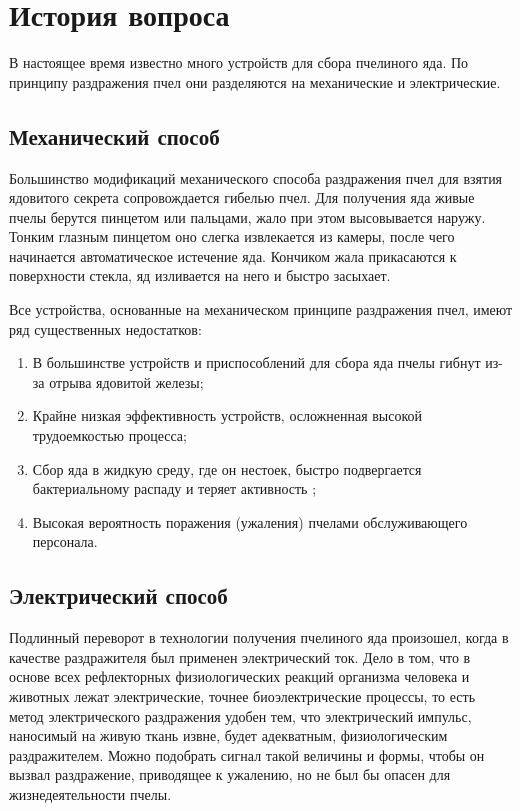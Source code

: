 \section{История вопроса}

В настоящее время известно много устройств для сбора пчелиного яда. По принципу раздражения пчел они разделяются на механические и электрические.

\subsection*{Механический способ}

Большинство модификаций механического способа раздражения пчел для взятия ядовитого секрета сопровождается гибелью пчел. Для получения яда живые пчелы берутся пинцетом или пальцами, жало при этом высовывается наружу. Тонким глазным пинцетом оно слегка извлекается из камеры, после чего начинается автомати­ческое истечение яда. Кончиком жала прикасаются к поверхности стекла, яд изливается на него и быстро засыхает.

Все устройства, основанные на механическом принципе раздра­жения пчел, имеют ряд существенных недостатков:
\begin{enumerate}
	\item В большинстве устройств и приспособлений для сбора яда пчелы гибнут из-за отрыва ядовитой железы; 
	\item Крайне низкая эффективность устройств, осложненная высо­кой трудоемкостью процесса;
	\item Сбор яда в жидкую среду, где он нестоек, быстро подвергает­ся бактериальному распаду и теряет активность \cite{Artemov_1969};
	\item Высокая вероятность поражения (ужаления) пчелами обслужи­вающего персонала.
\end{enumerate}

\subsection*{Электрический способ}

Подлинный переворот в технологии получения пчелиного яда произошел, когда в качестве раздражителя был применен электрический ток. Дело в том, что в основе всех рефлекторных физиологических реакций организма человека и животных лежат электрические, точнее \longndash биоэлектрические процессы, то есть метод электрического раздражения удобен тем, что электрический импульс, наносимый на живую ткань извне, будет адекватным, физиологическим раздражителем. Можно подобрать сигнал такой величины и формы, чтобы он вызвал раздражение, приводящее к ужалению, но не был бы опасен для жизнедеятельности пчелы.

